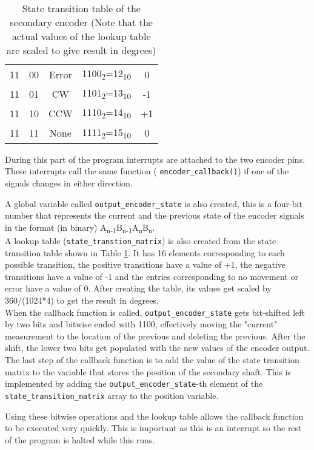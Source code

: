 \documentclass[12pt]{article}
\begin{document}
\begin{table}[h]
\begin{tabular}{|c|c|c|c|c|}
         11&00&Error&1100\textsubscript{2}=12\textsubscript{10}&0\\ 
         11&01&CW&1101\textsubscript{2}=13\textsubscript{10}&-1\\ 
         11&10&CCW&1110\textsubscript{2}=14\textsubscript{10}&+1\\ 
         11&11&None&1111\textsubscript{2}=15\textsubscript{10}&0\\ 
         \hline
    \end{tabular}
    \caption{State transition table of the secondary encoder (Note that the actual values of the lookup table are scaled to give result in degrees)}
    \label{tab:output_encoder}
\end{table}

During this part of the program interrupts are attached to the two encoder pins. These interrupts call the same function ( \verb|encoder_callback()|) if one of the signals changes in either direction.

A global variable called \verb|output_encoder_state| is also created, this is a four-bit number that represents the current and the previous state of the encoder signals in the format (in binary) A\textsubscript{n-1}B\textsubscript{n-1}A\textsubscript{n}B\textsubscript{n}. \\

A lookup table (\verb|state_transtion_matrix|) is also created from the state transition table shown in Table \ref{tab:output_encoder}. It has 16 elements corresponding to each possible transition, the positive transitions have a value of +1, the negative transitions have a value of -1 and the entries corresponding to no movement or error have a value of 0. After creating the table, its values get scaled by 360/(1024*4) to get the result in degrees.\\

When the callback function is called, \verb|output_encoder_state| gets bit-shifted left by two bits and bitwise ended with 1100, effectively moving the "current" measurement to the location of the previous and deleting the previous. After the shift, the lower two bits get populated with the new values of the encoder output. The last step of the callback function is to add the value of the state transition matrix to the variable that stores the position of the secondary shaft. This is implemented by adding the \verb|output_encoder_state|-th element of the \verb|state_transition_matrix| array to the position variable.

Using these bitwise operations and the lookup table allows the callback function to be executed very quickly. This is important as this is an interrupt so the rest of the program is halted while this runs.
\end{document}
